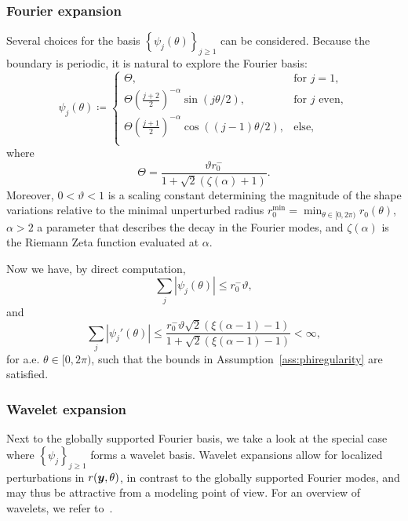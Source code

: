 \subsubsection{Fourier expansion}
Several choices for the basis $\left\{ \psi_j(\theta) \right\}_{j\geq 1}$ can be considered.
Because the boundary is periodic, it is natural to explore the Fourier basis:
\begin{equation}
    \psi_j(\theta)\coloneqq\begin{cases}
                               \Theta, & \text{for }j=1,\\
                               \Theta \left(  \frac{j+2}{2}\right)^{-\alpha}\sin(j \theta/2 ), & \text{for $j$ even},\\
                               \Theta \left( \frac{j+1}{2} \right)^{-\alpha}\cos((j-1) \theta / 2 ), & \text{else},\\
    \end{cases}\label{eq:fourierdef}
\end{equation}
where
\begin{equation*}
    \Theta=\frac{\vartheta r_0^-}{1+\sqrt{2}\left( \zeta(\alpha) + 1\right)}.
\end{equation*}
Moreover, $0<\vartheta<1$ is a scaling constant determining the magnitude of the shape variations relative to the minimal unperturbed radius $r_0^{\min}=\min_{\theta\in [0,2\pi)}r_{0}(\theta)$, $\alpha>2$ a parameter that describes the decay in the Fourier modes, and $\zeta(\alpha)$ is the Riemann Zeta function evaluated at $\alpha$.

Now we have, by direct computation,
\begin{equation*}
    \sum_j | \psi_j(\theta) | \leq r_0^-\vartheta,
\end{equation*}
and
\begin{equation*}
    \sum_j | \psi_j'(\theta) | \leq \frac{r_0^-\vartheta\sqrt {2}\left( \xi(\alpha - 1) - 1 \right)}{1+\sqrt {2}\left( \xi(\alpha - 1) - 1 \right)}<\infty,
\end{equation*}
for a.e. $\theta\in[0,2\pi)$, such that the bounds in Assumption~\ref{ass:phiregularity} are satisfied.

\subsubsection{Wavelet expansion}
Next to the globally supported Fourier basis, we take a look at the special case where $\left\{ \psi_j \right\}_{j\geq 1}$ forms a wavelet basis.
Wavelet expansions allow for localized perturbations in $r({\bm{y}}, \theta)$, in contrast to the globally supported Fourier modes, and may thus be attractive from a modeling point of view.
For an overview of wavelets, we refer to~\cite{meyer1994}.

